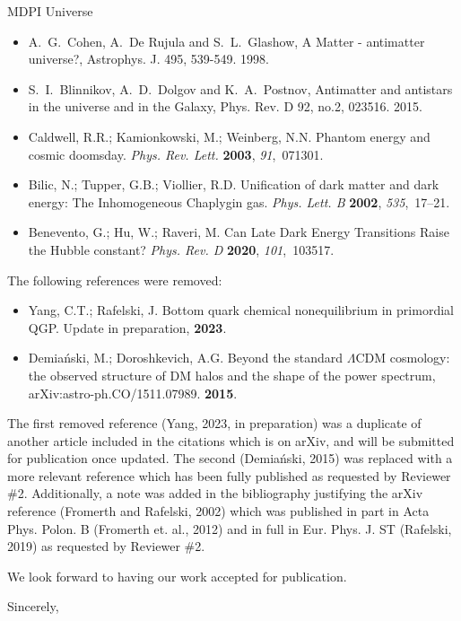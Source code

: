 \documentclass[a4paper, 10pt]{letter}
\begin{document}
\begin{letter}{MDPI Universe}
\begin{itemize}
    \item A.~G.~Cohen, A.~De Rujula and S.~L.~Glashow, {A Matter - antimatter universe?}, Astrophys. J. 495, 539-549. 1998.
    \item S.~I.~Blinnikov, A.~D.~Dolgov and K.~A.~Postnov, {Antimatter and antistars in the universe and in the Galaxy}, Phys. Rev. D 92, no.2, 023516. 2015.
    \item Caldwell, R.R.; Kamionkowski, M.; Weinberg, N.N. {Phantom energy and cosmic doomsday}. {\em Phys. Rev. Lett.} {\bf 2003}, {\em 91},~071301.
    \item Bilic, N.; Tupper, G.B.; Viollier, R.D. {Unification of dark matter and dark energy: The Inhomogeneous Chaplygin gas}. {\em Phys. Lett. B} {\bf 2002}, {\em 535},~17--21.
    \item Benevento, G.; Hu, W.; Raveri, M. {Can Late Dark Energy Transitions Raise the Hubble constant?} {\em Phys. Rev. D} {\bf 2020}, {\em 101},~103517.
\end{itemize}

The following references were removed:
\begin{itemize}
    \item Yang, C.T.; Rafelski, J. {Bottom quark chemical nonequilibrium in primordial QGP}. Update in preparation, {\bf 2023}.
    \item Demia\'nski, M.; Doroshkevich, A.G. {Beyond the standard $\Lambda$CDM cosmology: the observed structure of DM halos and the shape of the power spectrum}, arXiv:astro-ph.CO/1511.07989. {\bf 2015}.
\end{itemize}
The first removed reference (Yang, 2023, in preparation) was a duplicate of another article included in the citations which is on arXiv, and will be submitted for publication once updated. The second (Demia\'nski, 2015) was replaced with a more relevant reference which has been fully published as requested by Reviewer \#2. Additionally, a note was added in the bibliography justifying the arXiv reference (Fromerth and Rafelski, 2002) which was published in part in Acta Phys. Polon. B (Fromerth et. al., 2012) and in full in Eur. Phys. J. ST (Rafelski, 2019) as requested by Reviewer \#2.


We look forward to having our work accepted for publication.

\closing{Sincerely,}

\end{letter}
\end{document}
